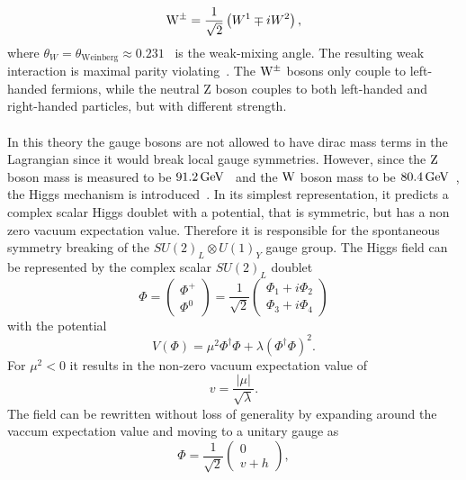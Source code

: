 \begin{equation}
 \mathrm{W}^\pm = \frac{1}{\sqrt{2}}\left(W^1\mp i W^2\right),
\end{equation}
where $\theta_W=\theta_{\text{Weinberg}}\approx0.231$~\cite{PDG} is the weak-mixing angle.
The resulting weak interaction is maximal parity violating~\cite{Wu,Goldhaber}. The $\mathrm{W}^\pm$ bosons only couple to left-handed fermions, while the neutral Z boson couples to both left-handed and right-handed particles, but with different strength.\\
\\In this theory the gauge bosons are not allowed to have dirac mass terms in the Lagrangian since it would break local gauge symmetries. However, since the $\mathrm{Z}$ boson mass is measured to be $91.2\,\text{Ge\hspace{-.08em}V}$~\cite{PDG} and the $\mathrm{W}$ boson mass to be $80.4\,\text{Ge\hspace{-.08em}V}$~\cite{PDG}, the Higgs mechanism is introduced~\cite{Higgs1,Higgs2,Higgs3}. In its simplest representation, it predicts a complex scalar Higgs doublet with a potential, that is symmetric, but has a non zero vacuum expectation value. Therefore it is responsible for the spontaneous symmetry breaking of the $ SU(2)_L\otimes U(1)_Y$ gauge group. The Higgs field can be represented by the complex scalar $SU(2)_L$ doublet
\begin{equation}
 \Phi=
 \left(\begin{matrix}
   \Phi^{+} \\
   \Phi^0
  \end{matrix}
 \right)
 =
 \frac{1}{\sqrt{2}}
 \left(\begin{matrix}
   \Phi_1 + i \Phi_2 \\
   \Phi_3 + i\Phi_4
  \end{matrix}
 \right)
\end{equation}
with the potential
\begin{equation}
 V(\Phi)=\mu^2 \Phi^{\dagger}\Phi+\lambda\left(\Phi^{\dagger}\Phi\right)^2.
\end{equation}
For $\mu^2<0$ it results in the non-zero vacuum expectation value of
\begin{equation}
 v = \frac{|\mu|}{\sqrt{\lambda}}.
\end{equation}
The field can be rewritten without loss of generality by expanding around the vaccum expectation value and moving to a unitary gauge as
\begin{equation}
 \Phi = \frac{1}{\sqrt{2}}
 \left(\begin{matrix}
   0 \\
   v+h
  \end{matrix}
 \right),
\end{equation}
